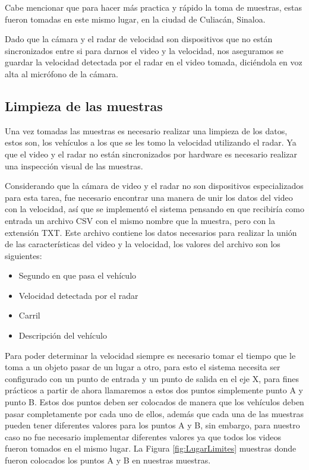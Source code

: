 Cabe mencionar que para hacer más practica y rápido la toma de muestras, estas fueron tomadas en este mismo lugar, en la ciudad de Culiacán, Sinaloa.

Dado que la cámara y el radar de velocidad son dispositivos que no están sincronizados entre si para darnos el video y la velocidad, nos aseguramos se guardar la velocidad detectada por el radar en el video tomada, diciéndola en voz alta al micrófono de la cámara.


\subsection{Limpieza de las muestras}

Una vez tomadas las muestras es necesario realizar una limpieza de los datos, estos son, los vehículos a los que se les tomo la velocidad utilizando el radar. Ya que el video y el radar no están sincronizados por hardware es necesario realizar una inspección visual de las muestras.

Considerando que la cámara de video y el radar no son dispositivos especializados para esta tarea, fue necesario encontrar una manera de unir los datos del video con la velocidad, así que se implementó el sistema pensando en que recibiría como entrada un archivo CSV con el mismo nombre que la muestra, pero con la extensión TXT. Este archivo contiene los datos necesarios para realizar la unión de las características del video y la velocidad, los valores del archivo son los siguientes:

\begin{itemize}
    \item Segundo en que pasa el vehículo
    \item Velocidad detectada por el radar
    \item Carril
    \item Descripción del vehículo
\end{itemize}

Para poder determinar la velocidad siempre es necesario tomar el tiempo que le toma a un objeto pasar de un lugar a otro, para esto el sistema necesita ser configurado con un punto de entrada y un punto de salida en el eje X, para fines prácticos a partir de ahora llamaremos a estos dos puntos simplemente punto A y punto B.  Estos dos puntos deben ser colocados de manera que los vehículos deben pasar completamente por cada uno de ellos, además que cada una de las muestras pueden tener diferentes valores para los puntos A y B, sin embargo, para nuestro caso no fue necesario implementar diferentes valores ya que todos los videos fueron tomados en el mismo lugar. La Figura \ref{fig:LugarLimites} muestras donde fueron colocados los puntos A y B en nuestras muestras.


